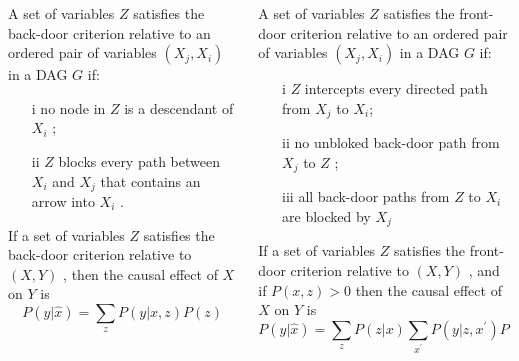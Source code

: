 \documentclass{beamer}
\begin{document}
\begin{frame}

\begin{columns}
\begin{column}{.48\textwidth}

\begin{definition}
\scriptsize A set of variables $Z$ satisfies the back-door criterion
relative to an ordered pair of variables $(X_j , X_i)$ in a DAG
$G$ if:
\begin{itemize}
\item [i] no node in $Z$ is a descendant of $X_i$ ;
\item [ii] $Z$ blocks every path between $X_i$ and $X_j$ that
contains an arrow into $X_i$ .
\end{itemize}
\end{definition}

\begin{theorem}
\scriptsize If a set of variables $Z$ satisfies the back-door criterion
relative to $(X, Y)$ , then the causal effect of $X$ on $Y$ is
$$
P(y|\hat{x}) = \sum_{z} P(y|x,z)P(z)
$$
\end{theorem}

\end{column}%
\hfill%
\begin{column}{.48\textwidth}

\begin{definition}
\scriptsize A set of variables $Z$ satisfies the front-door criterion
relative to an ordered pair of variables $(X_j , X_i)$ in a DAG
$G$ if:
\begin{itemize}
\item [i] $Z$ intercepts every directed path from $X_j$ to $X_i$;
\item [ii] no unbloked back-door path from $X_j$ to $Z$ ;
\item [iii] all back-door paths from $Z$ to $X_i$ are blocked by $X_j$
\end{itemize}
\end{definition}

\begin{theorem}
\scriptsize If a set of variables $Z$ satisfies the front-door criterion
relative to $(X, Y)$ , and if $P(x,z)>0$ then the causal effect of $X$ on $Y$ is
$$
P(y|\hat{x}) = \sum_{z} P(z|x)\sum_{x^{'}}P(y|z,x^{'})P(x^{'})
$$
\end{theorem}

\end{column}%
\end{columns}


\end{frame}
\end{document}
